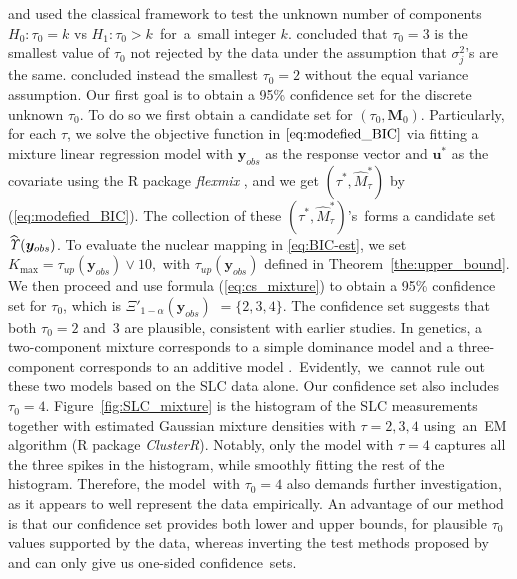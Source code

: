 \documentclass[12pt]{article}
\theoremstyle{shortspace}
\def\*#1{\bm{#1}}
\begin{document}
\cite{roeder_graphical_1994} and \cite{chen_inference_2012} used the classical framework to test the unknown number of components $H_0: \tau_0 = k$ vs $H_1: \tau_0>k$~for~a~small integer $k.$ \cite{roeder_graphical_1994} concluded that $\tau_0=3$ is the smallest value of $\tau_0$ not rejected by the data under the assumption that $\sigma_j^2$'s are
the same.  
\cite{chen_inference_2012} concluded instead the smallest 
$\tau_0 =2$ without the equal variance assumption.
Our first goal is to obtain a   
95\% confidence set for the discrete unknown $\tau_0$. 
To do so we first obtain a candidate set for $(\tau_0, \*M_0)$. 
Particularly, for each $\tau$, we solve the objective function in  $\eqref{eq:modefied_BIC}$ via fitting a mixture linear regression model with $\*y_{obs}$ as the response vector and $\*u^*$ as the covariate  
using the R package {\it flexmix} \citep{grun2007fitting}, and we get $(\tau^*, \widehat M_{\tau}^*)$ by (\ref{eq:modefied_BIC}). The collection of these $(\tau^*, \widehat M_{\tau}^*)$'s~forms a candidate set $\widehat{\it \Upsilon}(\*y_{obs})$. To evaluate the nuclear mapping in \eqref{eq:BIC-est}, we set $K_{\max} = \tau_{up}(\*y_{obs}) \vee 10,$ with $\tau_{up}(\*y_{obs})$  defined in Theorem~\ref{the:upper_bound}. We then proceed and use formula (\ref{eq:cs_mixture}) to obtain a 95\% confidence set for $\tau_0$, which is $\Xi'_{1-\alpha}(\*y_{obs}) $ $= \{2, 3, 4\}.$
The confidence set  
 suggests
that both $\tau_0=2$ and~$3$ are plausible, consistent with earlier studies.  In genetics, a two-component mixture 
corresponds to a simple dominance model and a three-component corresponds to an additive model \citep{roeder_graphical_1994}.~Evidently,~we~cannot rule out these two models based on the SLC data alone. Our confidence set also includes
$\tau_0 = 4$.
Figure~\ref{fig:SLC_mixture} is the histogram of the SLC measurements together with estimated Gaussian mixture densities with $\tau =2,3,4$ using~an~EM algorithm (R package {\it ClusterR}).  Notably, only the  
model with $\tau=4$ captures all the three spikes in the histogram, while smoothly fitting the rest of the histogram.
Therefore, the model~with $\tau_0=4$ also demands further investigation, as it appears to 
well represent the data empirically. An advantage of our method is that our
confidence set 
provides both lower and upper bounds, for plausible  $\tau_0$  values supported by the data, 
whereas inverting the test methods proposed by \cite{roeder_graphical_1994} and \cite{chen_inference_2012} can only give us one-sided confidence~sets. 
\end{document}
